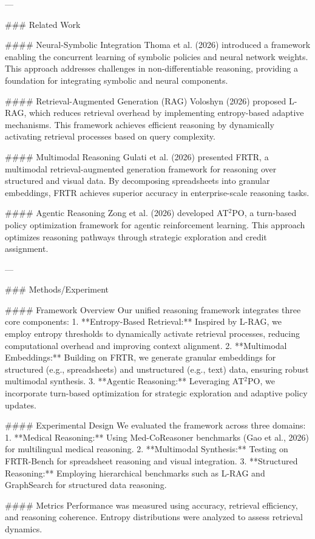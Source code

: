 ---

### Related Work

#### Neural-Symbolic Integration
Thoma et al. (2026) introduced a framework enabling the concurrent learning of symbolic policies and neural network weights. This approach addresses challenges in non-differentiable reasoning, providing a foundation for integrating symbolic and neural components.

#### Retrieval-Augmented Generation (RAG)
Voloshyn (2026) proposed L-RAG, which reduces retrieval overhead by implementing entropy-based adaptive mechanisms. This framework achieves efficient reasoning by dynamically activating retrieval processes based on query complexity.

#### Multimodal Reasoning
Gulati et al. (2026) presented FRTR, a multimodal retrieval-augmented generation framework for reasoning over structured and visual data. By decomposing spreadsheets into granular embeddings, FRTR achieves superior accuracy in enterprise-scale reasoning tasks.

#### Agentic Reasoning
Zong et al. (2026) developed AT$^2$PO, a turn-based policy optimization framework for agentic reinforcement learning. This approach optimizes reasoning pathways through strategic exploration and credit assignment.

---

### Methods/Experiment

#### Framework Overview
Our unified reasoning framework integrates three core components:
1. **Entropy-Based Retrieval:** Inspired by L-RAG, we employ entropy thresholds to dynamically activate retrieval processes, reducing computational overhead and improving context alignment.
2. **Multimodal Embeddings:** Building on FRTR, we generate granular embeddings for structured (e.g., spreadsheets) and unstructured (e.g., text) data, ensuring robust multimodal synthesis.
3. **Agentic Reasoning:** Leveraging AT$^2$PO, we incorporate turn-based optimization for strategic exploration and adaptive policy updates.

#### Experimental Design
We evaluated the framework across three domains:
1. **Medical Reasoning:** Using Med-CoReasoner benchmarks (Gao et al., 2026) for multilingual medical reasoning.
2. **Multimodal Synthesis:** Testing on FRTR-Bench for spreadsheet reasoning and visual integration.
3. **Structured Reasoning:** Employing hierarchical benchmarks such as L-RAG and GraphSearch for structured data reasoning.

#### Metrics
Performance was measured using accuracy, retrieval efficiency, and reasoning coherence. Entropy distributions were analyzed to assess retrieval dynamics.


